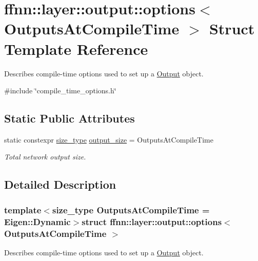\hypertarget{structffnn_1_1layer_1_1output_1_1options}{\section{ffnn\-:\-:layer\-:\-:output\-:\-:options$<$ Outputs\-At\-Compile\-Time $>$ Struct Template Reference}
\label{structffnn_1_1layer_1_1output_1_1options}
}


Describes compile-\/time options used to set up a \hyperlink{classffnn_1_1layer_1_1_output}{Output} object.  




{\ttfamily \#include \char`\"{}compile\-\_\-time\-\_\-options.\-h\char`\"{}}

\subsection*{Static Public Attributes}
\begin{DoxyCompactItemize}
\item 
static constexpr \hyperlink{namespaceffnn_a63b90a2fd70eb76684eac482a51633e5}{size\-\_\-type} \hyperlink{structffnn_1_1layer_1_1output_1_1options_a8aa6cec799240a3620701c6b4baaef02}{output\-\_\-size} = Outputs\-At\-Compile\-Time
\begin{DoxyCompactList}\small\item\em Total network output size. \end{DoxyCompactList}\end{DoxyCompactItemize}


\subsection{Detailed Description}
\subsubsection*{template$<$size\-\_\-type Outputs\-At\-Compile\-Time = Eigen\-::\-Dynamic$>$struct ffnn\-::layer\-::output\-::options$<$ Outputs\-At\-Compile\-Time $>$}

Describes compile-\/time options used to set up a \hyperlink{classffnn_1_1layer_1_1_output}{Output} object. 

